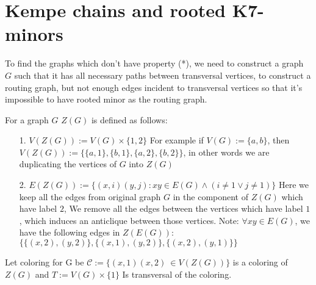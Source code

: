 \section{Kempe chains and rooted K7-minors}

To find the graphs which don't have property (*), we need to construct a graph $G$ such that it has all necessary paths between transversal vertices, to construct a routing graph,
but not enough edges incident to transversal vertices so that it's impossible to have rooted minor as the routing graph.

\begin{defn}[Z(G)]
    For a graph $G$ $Z(G)$ is defined as follows:
    \begin{itemize}
        \item[1.] $V(Z(G)) := V(G) \times \{1, 2\}$ \newline
        For example if $V(G) := \{a, b\}$, then $V(Z(G)) := \{\{a, 1\}, \{b, 1\}, \{a, 2\}, \{b, 2\}\}$,
        in other words we are duplicating the vertices of $G$ into $Z(G)$
        \item[2.]  $E(Z(G)) := \{(x, i)(y, j) : xy \in E(G) \land (i \neq 1 \lor j \neq 1)\}$ \newline
        Here we keep all the edges from original graph $G$ in the component of $Z(G)$ which have label $2$, 
        We remove all the edges between the vertices which have label $1$, which induces an anticlique between those vertices.
        Note: $\forall xy \in E(G)$, we have the following edges in $Z(E(G))$: $\{\{(x, 2), (y, 2)\}, \{(x, 1), (y, 2)\}, \{(x, 2), (y, 1)\}\}$
      \end{itemize}
\end{defn}
Let coloring for G be $\mathcal{C} := \{(x, 1)(x, 2)\ \in V(Z(G))\}$ is a coloring of $Z(G)$ and $T := V(G) \times \{1\}$
Is transversal of the coloring.
